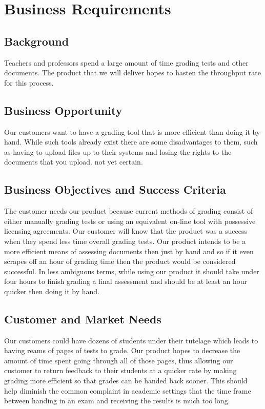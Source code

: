 \section{Business Requirements}
\subsection{Background}
Teachers and professors spend a large amount of time grading tests and other documents. The product that we will deliver hopes to hasten the throughput rate for this process.

\subsection{Business Opportunity}
Our customers want to have a grading tool that is more efficient than doing it by hand. While such tools already exist there are some disadvantages to them, such as having to upload files up to their systems and losing the rights to the documents that you upload.
not yet certain.
\subsection{Business Objectives and Success Criteria}
The customer needs our product because current methods of grading consist of either manually grading tests or using an equivalent on-line tool with possessive licensing agreements.
Our customer will know that the product was a success when they spend less time overall grading tests. Our product intends to be a more efficient means of assessing documents then just by hand and so if it even scrapes off an hour of grading time then the product would be considered successful.
In less ambiguous terms, while using our product it should take under four hours to finish grading a final assessment and should be at least an hour quicker then doing it by hand.
\subsection{Customer and Market Needs}
Our customers could have dozens of students under their tutelage which leads to having reams of pages of tests to grade. Our product hopes to decrease the amount of time spent going through all of those pages, thus allowing our customer to return feedback to their students at a quicker rate by making grading more efficient so that grades can be handed back sooner. This should help diminish the common complaint in academic settings that the time frame between handing in an exam and receiving the results is much too long.
